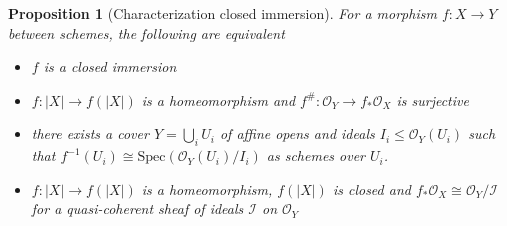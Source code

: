 \documentclass{scrartcl}
\newcommand{\Spec}{\mathrm{Spec}}
\renewcommand{\O}{\mathcal{O}}
\newtheorem{prop}{Proposition}[section]
\theoremstyle{definition}
\begin{document}
\begin{prop}[Characterization closed immersion]
    For a morphism $f: X \to Y$ between schemes, the following are equivalent
    \begin{itemize}
        \item $f$ is a closed immersion
        \item $f: |X| \to f(|X|)$ is a homeomorphism and $f^\#: \O_Y \to f_*\O_X$ is surjective
        \item there exists a cover $Y = \bigcup_i U_i$ of affine opens and ideals $I_i \leq \O_Y(U_i)$ such that $f^{-1}(U_i) \cong \Spec(\O_Y(U_i)/I_i)$ as schemes over $U_i$.
        \item $f: |X| \to f(|X|)$ is a homeomorphism, $f(|X|)$ is closed and $f_*\O_X \cong \O_Y/\mathcal{I}$ for a quasi-coherent sheaf of ideals $\mathcal{I}$ on $\O_Y$
    \end{itemize}
\end{prop}
\end{document}
